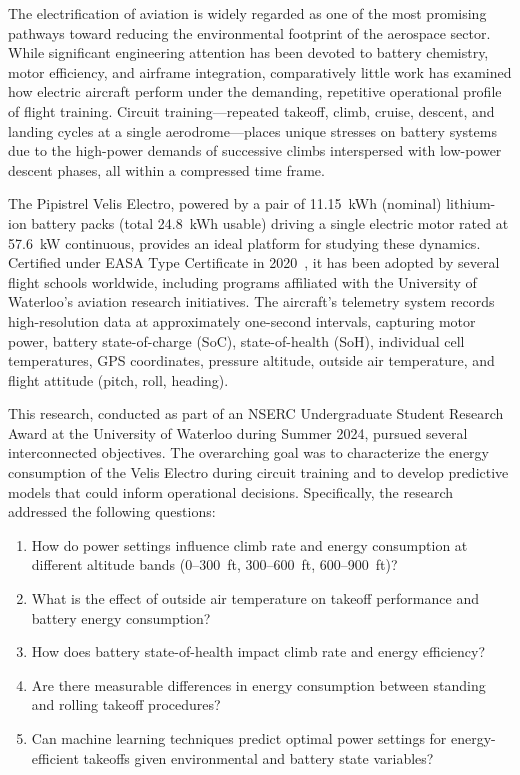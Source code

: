 \documentclass[11pt,a4paper]{article}
\begin{document}
The electrification of aviation is widely regarded as one of the most promising pathways toward reducing the environmental footprint of the aerospace sector.
While significant engineering attention has been devoted to battery chemistry, motor efficiency, and airframe integration, comparatively little work has examined how electric aircraft perform under the demanding, repetitive operational profile of flight training.
Circuit training---repeated takeoff, climb, cruise, descent, and landing cycles at a single aerodrome---places unique stresses on battery systems due to the high-power demands of successive climbs interspersed with low-power descent phases, all within a compressed time frame.

The Pipistrel Velis Electro, powered by a pair of 11.15~kWh (nominal) lithium-ion battery packs (total 24.8~kWh usable) driving a single electric motor rated at 57.6~kW continuous, provides an ideal platform for studying these dynamics.
Certified under EASA Type Certificate in 2020~\cite{easa_tc}, it has been adopted by several flight schools worldwide, including programs affiliated with the University of Waterloo's aviation research initiatives.
The aircraft's telemetry system records high-resolution data at approximately one-second intervals, capturing motor power, battery state-of-charge (SoC), state-of-health (SoH), individual cell temperatures, GPS coordinates, pressure altitude, outside air temperature, and flight attitude (pitch, roll, heading).

This research, conducted as part of an NSERC Undergraduate Student Research Award at the University of Waterloo during Summer 2024, pursued several interconnected objectives.
The overarching goal was to characterize the energy consumption of the Velis Electro during circuit training and to develop predictive models that could inform operational decisions.
Specifically, the research addressed the following questions:

\begin{enumerate}[label=(\roman*)]
    \item How do power settings influence climb rate and energy consumption at different altitude bands (0--300~ft, 300--600~ft, 600--900~ft)?
    \item What is the effect of outside air temperature on takeoff performance and battery energy consumption?
    \item How does battery state-of-health impact climb rate and energy efficiency?
    \item Are there measurable differences in energy consumption between standing and rolling takeoff procedures?
    \item Can machine learning techniques predict optimal power settings for energy-efficient takeoffs given environmental and battery state variables?
\end{enumerate}
\end{document}
